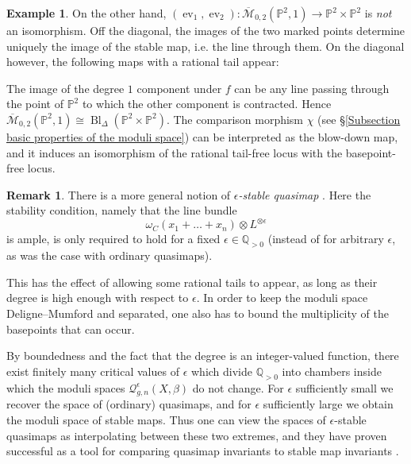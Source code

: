\documentclass[11pt]{amsart}
\newcommand{\M}[4]{\overline{\mathcal{M}}_{#1,#2}(#3,#4)}
\newcommand{\Q}[4]{\mathcal{Q}_{#1,#2}(#3,#4)}
\newcommand{\Qe}[4]{\mathcal{Q}^{\epsilon}_{#1,#2}(#3,#4)}
\newcommand{\PP}{\mathbb P}
\renewcommand{\to}{\rightarrow}
\newcommand{\comp}{\chi}
\newcommand{\QQ}{\mathbb{Q}}
\newcommand{\ev}{\operatorname{ev}}
\theoremstyle{definition}
\theoremstyle{definition}
\newtheorem{example}[thm]{Example}
\newtheorem{remark}[thm]{Remark}
\newcommand{\ilemph}[1]{\emph{#1}}
\begin{document}
\begin{example}
On the other hand, $(\ev_1,\ev_2)\colon\M{0}{2}{\PP^2}{1}\to\PP^2\times\PP^2$ is \emph{not} an isomorphism. Off the diagonal, the images of the two marked points determine uniquely the image of the stable map, i.e. the line through them. On the diagonal however, the following maps with a rational tail appear:
\begin{center}
\end{center}
The image of the degree $1$ component under $f$ can be any line passing through the point of $\PP^2$ to which the other component is contracted. Hence $\M{0}{2}{\PP^2}{1}\cong\operatorname{Bl}_{\Delta}(\PP^2\times\PP^2)$. The comparison morphism $\comp$ (see \S \ref{Subsection basic properties of the moduli space}) can be interpreted as the blow-down map, and it induces an isomorphism of the rational tail-free locus with the basepoint-free locus.
\end{example}


\begin{remark}
 There is a more general notion of \ilemph{$\epsilon$-stable quasimap} \cite[\S 7.1]{CFKM}. Here the stability condition, namely that the line bundle
\begin{equation*} \omega_C(x_1 + \ldots + x_n)\otimes L^{\otimes \epsilon} \end{equation*} 
is ample, is only required to hold for a fixed $\epsilon \in \QQ_{>0}$ (instead of for arbitrary $\epsilon$, as was the case with ordinary quasimaps).

This has the effect of allowing some rational tails to appear, as long as their degree is high enough with respect to $\epsilon$. In order to keep the moduli space Deligne--Mumford and separated, one also has to bound the multiplicity of the basepoints that can occur.

By boundedness and the fact that the degree is an integer-valued function, there exist finitely many critical values of $\epsilon$ which divide $\QQ_{>0}$ into chambers inside which the moduli spaces $\Qe{g}{n}{X}{\beta}$ do not change.
For $\epsilon$ sufficiently small we recover the space of (ordinary) quasimaps, and for $\epsilon$ sufficiently large we obtain the moduli space of stable maps. Thus one can view the spaces of $\epsilon$-stable quasimaps as interpolating between these two extremes, and they have proven  successful as a tool for comparing quasimap invariants to stable map invariants \cite{TodaStableQuotient} \cite{CF-K-wallcrossing}.
\end{remark}
\end{document}
